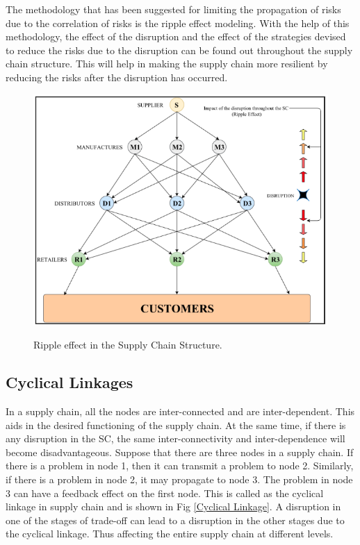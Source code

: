 The methodology that has been suggested for limiting the propagation of risks due to the correlation of risks is the ripple effect modeling. With the help of this methodology, the effect of the disruption and the effect of the strategies devised to reduce the risks due to the disruption can be found out throughout the supply chain structure. This will help in making the supply chain more resilient by reducing the risks after the disruption has occurred.

\begin{figure}[H]
  \centering
  \includegraphics[width=6.5in]{figures/pdf/Ripple-effect.png}\\
  \caption{Ripple effect in the Supply Chain Structure.}\label{Ripple effect}
\end{figure}

\newpage
\subsection{Cyclical Linkages}

In a supply chain, all the nodes are inter-connected and are inter-dependent. This aids in the desired functioning of the supply chain. At the same time, if there is any disruption in the SC, the same inter-connectivity and inter-dependence will become disadvantageous. Suppose that there are three nodes in a supply chain. If there is a problem in node 1, then it can transmit a problem to node 2. Similarly, if there is a problem in node 2, it may propagate to node 3. The problem in node 3 can have a feedback effect on the first node. This is called as the cyclical linkage in supply chain and is shown in Fig \ref{Cyclical Linkage}. A disruption in one of the stages of trade-off can lead to a disruption in the other stages due to the cyclical linkage. Thus affecting the entire supply chain at different levels.

